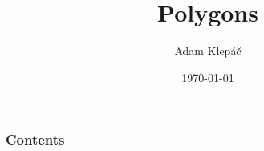 \documentclass[aspectratio=169,11pt,svgnames]{beamer}
\title{Polygons}
\date{\today}
\author{Adam Klepáč}
\institute[GEVO]{Gymnázium Evolution Jižní Město}
\begin{document}
\titleframe

\begin{frame}
 \frametitle{Contents}
 \tableofcontents
\end{frame}

%
%
%
%
\end{document}
